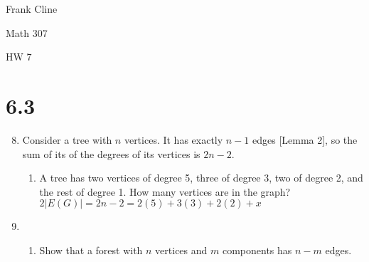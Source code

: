 \documentclass[12pt]{article}
\newcommand{\be}{\begin{enumerate}}
\newcommand{\ee}{\end{enumerate}}
\newcommand{\seti}[1]{\setcounter{enumi}{#1}}
\begin{document}
\onehalfspacing
\hfill Frank Cline

\hfill Math 307

\hfill HW 7


\section*{6.3}
\be

\seti{7}
\item Consider a tree with $n$ vertices. It has exactly $n-1$ edges [Lemma 2], so the sum of its of the degrees of its vertices is $2n-2$.
	\be
	\item A tree has two vertices of degree 5, three of degree 3, two of degree 2, and the rest of degree 1. 	How many vertices are in the graph?\\
	
	$2|E(G)| = 2n-2 = 2(5)+3(3)+2(2)+x$
	
	\ee

\seti{10}
\item
	\be
	\item Show that a forest with $n$ vertices and $m$ components has $n-m$ edges.\\
	
	
	\ee
\ee
\end{document}
